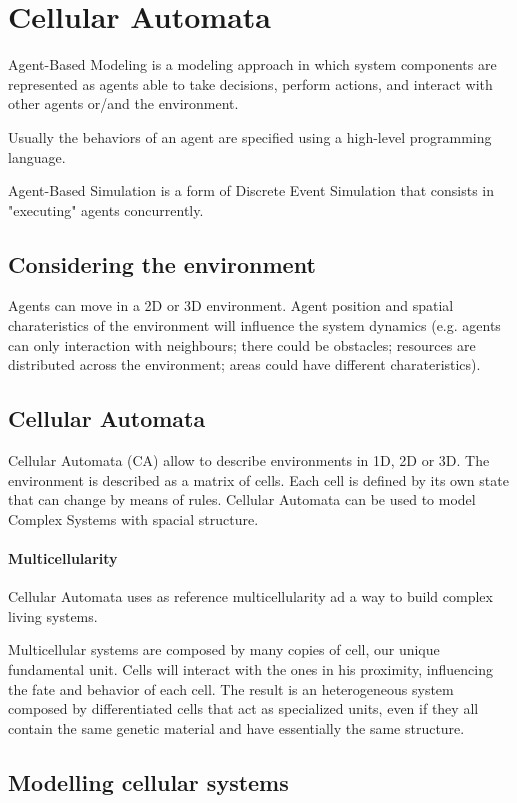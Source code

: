 \chapter{Cellular Automata}
Agent-Based Modeling is a modeling approach in which system components are represented as agents able to take decisions, perform actions, and interact with other agents or/and the environment.\par
Usually the behaviors of an agent are specified using a high-level programming language.\par
Agent-Based Simulation is a form of Discrete Event Simulation that consists in "executing" agents concurrently.

\section{Considering the environment}
Agents can move in a 2D or 3D environment. Agent position and spatial charateristics of the environment will influence the system dynamics (e.g. agents can only interaction with neighbours; there could be obstacles; resources are distributed across the environment; areas could have different charateristics).

\section{Cellular Automata}
Cellular Automata (CA) allow to describe environments in 1D, 2D or 3D. The environment is described as a matrix of cells. Each cell is defined by its own state that can change by means of rules. Cellular Automata can be used to model Complex Systems with spacial structure.\par

\subsubsection{Multicellularity}
Cellular Automata uses as reference multicellularity ad a way to build complex living systems.\par
Multicellular systems are composed by many copies of cell, our unique fundamental unit. Cells will interact with the ones in his proximity, influencing the fate and behavior of each cell. The result is an heterogeneous system composed by differentiated cells that act as specialized units, even if they all contain the same genetic material and have essentially the same structure.

\section{Modelling cellular systems}
